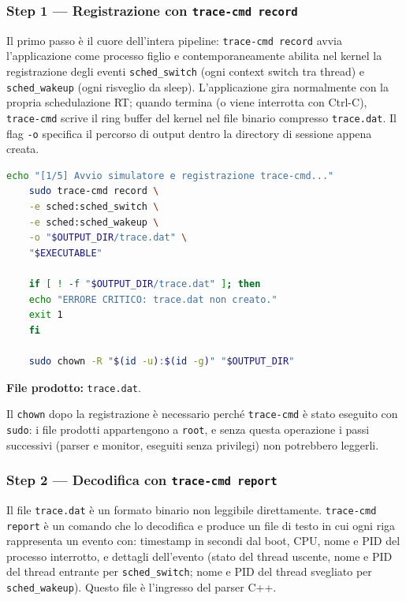 \subsubsection{Step 1 --- Registrazione con \texttt{trace-cmd record}}

Il primo passo è il cuore dell'intera pipeline: \texttt{trace-cmd record} avvia
l'applicazione come processo figlio e contemporaneamente abilita nel kernel la
registrazione degli eventi \texttt{sched\_switch} (ogni context switch tra thread)
e \texttt{sched\_wakeup} (ogni risveglio da sleep). L'applicazione gira normalmente
con la propria schedulazione RT; quando termina (o viene interrotta con Ctrl-C),
\texttt{trace-cmd} scrive il ring buffer del kernel nel file binario compresso
\texttt{trace.dat}. Il flag \texttt{-o} specifica il percorso di output dentro la
directory di sessione appena creata.

\begin{lstlisting}[language=bash, caption={\texttt{run\_trace.sh} -- Step 1: acquisizione eventi kernel con trace-cmd}]
	echo "[1/5] Avvio simulatore e registrazione trace-cmd..."
	sudo trace-cmd record \
	-e sched:sched_switch \
	-e sched:sched_wakeup \
	-o "$OUTPUT_DIR/trace.dat" \
	"$EXECUTABLE"
	
	if [ ! -f "$OUTPUT_DIR/trace.dat" ]; then
	echo "ERRORE CRITICO: trace.dat non creato."
	exit 1
	fi
	
	sudo chown -R "$(id -u):$(id -g)" "$OUTPUT_DIR"
\end{lstlisting}

\noindent\textbf{File prodotto:} \texttt{trace.dat}.

Il \texttt{chown} dopo la registrazione è necessario perché \texttt{trace-cmd}
è stato eseguito con \texttt{sudo}: i file prodotti appartengono a \texttt{root},
e senza questa operazione i passi successivi (parser e monitor, eseguiti senza
privilegi) non potrebbero leggerli.



\subsubsection{Step 2 --- Decodifica con \texttt{trace-cmd report}}

Il file \texttt{trace.dat} è un formato binario non leggibile
direttamente. \texttt{trace-cmd report} è un comando che lo decodifica e produce un file di testo in cui ogni riga rappresenta un evento con: timestamp in secondi dal boot,
CPU, nome e PID del processo interrotto, e dettagli dell'evento (stato del
thread uscente, nome e PID del thread entrante per \texttt{sched\_switch};
nome e PID del thread svegliato per \texttt{sched\_wakeup}). Questo file è
l'ingresso del parser C++.

